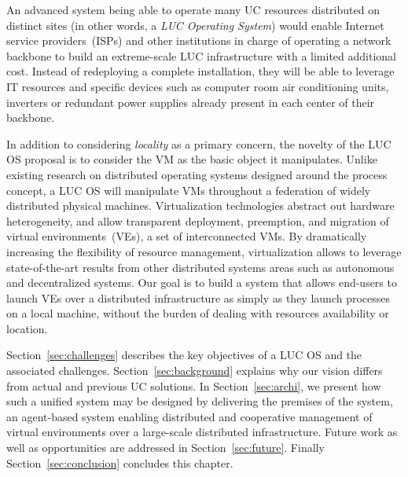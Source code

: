 \begin{svgraybox}
An advanced system being able to operate 
many UC resources distributed on distinct sites (in other words, a \emph{LUC
  Operating System}) would enable%
Internet service providers~(ISPs) and other institutions in
charge of operating a network backbone to build an extreme-scale
LUC infrastructure with a limited additional cost. Instead of redeploying a
complete installation, they will be able to leverage IT resources and
specific devices such as computer room air conditioning units, inverters or
redundant power supplies already present in each center of their
backbone. 
\end{svgraybox}


\medskip

In addition to considering \emph{locality} as a primary concern, the novelty of the LUC OS
proposal is to consider the VM as the basic object it manipulates.  Unlike existing
research on distributed operating systems designed around the process concept, a LUC OS will manipulate VMs throughout a federation of widely distributed
physical machines. Virtualization technologies abstract out hardware heterogeneity, and allow
transparent deployment, preemption, and migration of virtual
environments~(VEs), \ie a set of interconnected VMs.
By dramatically increasing the flexibility of resource management, virtualization 
allows to leverage state-of-the-art results from other distributed
systems areas such as autonomous and decentralized systems.  
Our goal is to build a system that allows end-users to launch VEs over a
distributed infrastructure as simply as they launch processes on a
local machine, \ie  without the burden of dealing with resources
availability or location.

Section~\ref{sec:challenges} describes the key objectives of a LUC OS and the associated challenges. 
Section~\ref{sec:background} explains why our vision differs from actual and previous UC solutions. In
Section~\ref{sec:archi}, we present how such a unified system may be designed
by delivering the premises of the \discovery system, an agent-based system
enabling distributed and cooperative management of virtual environments over a
large-scale distributed infrastructure.
Future work as well as opportunities  are addressed in Section~\ref{sec:future}. Finally Section~\ref{sec:conclusion} concludes this chapter. 
